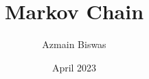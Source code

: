 \documentclass[]{report}
\title{Markov Chain}
\author{Azmain Biswas}
\date{April 2023}
\theoremstyle{remark}
\theoremstyle{definition}
\theoremstyle{definition}
\begin{document}
\maketitle
\tableofcontents









\appendix

\nocite{*}


\end{document}
